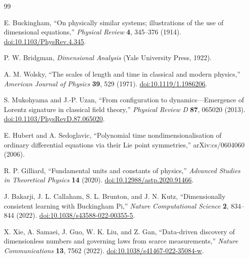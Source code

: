 \documentclass[10pt]{article}
\begin{document}
\begin{thebibliography}{99}
\small

E. Buckingham,
``On physically similar systems; illustrations of the use of
dimensional equations,''
\emph{Physical Review} \textbf{4}, 345--376 (1914).
\href{https://doi.org/10.1103/PhysRev.4.345}
{doi:10.1103/PhysRev.4.345}.

P. W. Bridgman,
\emph{Dimensional Analysis}
(Yale University Press, 1922).

A. M. Wolsky,
``The scales of length and time in classical and modern physics,''
\emph{American Journal of Physics} \textbf{39}, 529 (1971).
\href{https://doi.org/10.1119/1.1986206}
{doi:10.1119/1.1986206}.

S. Mukohyama and J.-P. Uzan,
``From configuration to dynamics---Emergence of Lorentz signature
in classical field theory,''
\emph{Physical Review D} \textbf{87}, 065020 (2013).
\href{https://doi.org/10.1103/PhysRevD.87.065020}
{doi:10.1103/PhysRevD.87.065020}.

E. Hubert and A. Sedoglavic,
``Polynomial time nondimensionalisation of ordinary differential
equations via their Lie point symmetries,''
arXiv:cs/0604060 (2006).

R. P. Gilliard,
``Fundamental units and constants of physics,''
\emph{Advanced Studies in Theoretical Physics}
\textbf{14} (2020).
\href{https://doi.org/10.12988/astp.2020.91466}
{doi:10.12988/astp.2020.91466}.

J. Bakarji, J. L. Callaham, S. L. Brunton, and J. N. Kutz,
``Dimensionally consistent learning with Buckingham Pi,''
\emph{Nature Computational Science}
\textbf{2}, 834--844 (2022).
\href{https://doi.org/10.1038/s43588-022-00355-5}
{doi:10.1038/s43588-022-00355-5}.

X. Xie, A. Samaei, J. Guo, W. K. Liu, and Z. Gan,
``Data-driven discovery of dimensionless numbers and governing laws
from scarce measurements,''
\emph{Nature Communications}
\textbf{13}, 7562 (2022).
\href{https://doi.org/10.1038/s41467-022-35084-w}
{doi:10.1038/s41467-022-35084-w}.

\end{thebibliography}
\end{document}
